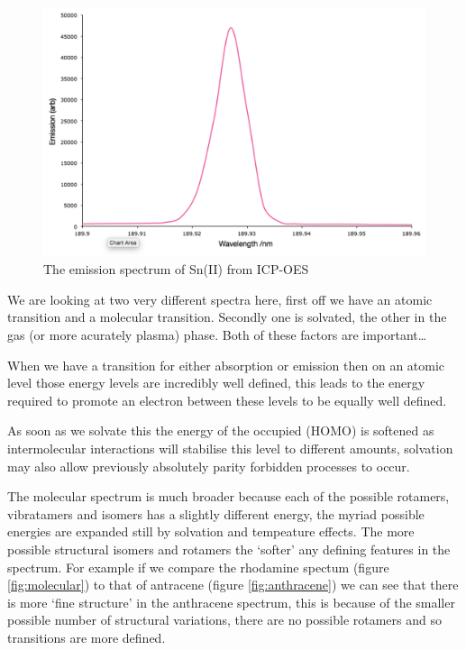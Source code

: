 \documentclass[
]{book}
\begin{document}
\begin{figure}

{\centering \includegraphics[width=0.7\linewidth]{images/atomic_emission_spectrum} 

}

\caption{The emission spectrum of Sn(II) from ICP-OES}\label{fig:atomic}
\end{figure}

We are looking at two very different spectra here, first off we have an atomic transition and a molecular transition. Secondly one is solvated, the other in the gas (or more acurately plasma) phase. Both of these factors are important\ldots{}

When we have a transition for either absorption or emission then on an atomic level those energy levels are incredibly well defined, this leads to the energy required to promote an electron between these levels to be equally well defined.

As soon as we solvate this the energy of the occupied (HOMO) is softened as intermolecular interactions will stabilise this level to different amounts, solvation may also allow previously absolutely parity forbidden processes to occur.

The molecular spectrum is much broader because each of the possible rotamers, vibratamers and isomers has a slightly different energy, the myriad possible energies are expanded still by solvation and tempeature effects. The more possible structural isomers and rotamers the `softer' any defining features in the spectrum. For example if we compare the rhodamine spectum (figure \ref{fig:molecular}) to that of antracene (figure \ref{fig:anthracene}) we can see that there is more `fine structure' in the anthracene spectrum, this is because of the smaller possible number of structural variations, there are no possible rotamers and so transitions are more defined.
\end{document}
